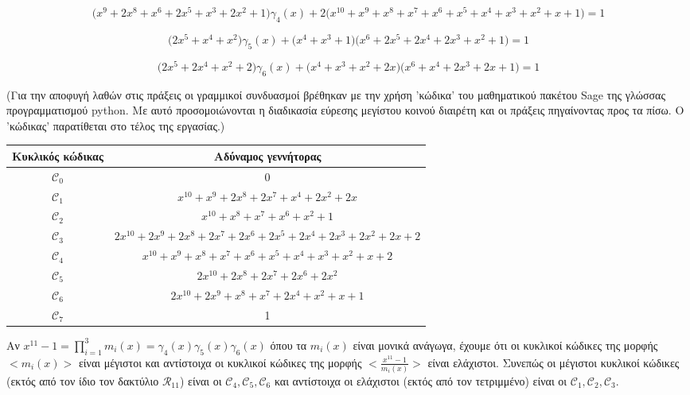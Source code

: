 \documentclass[oneside,a4paper]{article}
\newcommand {\tl}{\textlatin}
\newcommand{\C}{\mathcal{C}}
\newcommand{\R}{\mathcal{R}_{11}}
\begin{document}
\begin{enumerate}
	$$\bigg(x^{9} + 2 x^{8} + x^{6} + 2 x^{5} + x^{3} + 2 x^{2} + 1\bigg) \gamma_4 (x) + 2 \bigg(x^{10} + x^{9} + x^{8} + x^{7} + x^{6} + x^{5} + x^{4} + x^{3} + x^{2} + x + 1\bigg) = 1$$ 

	$$\bigg(2 x^{5} + x^{4} + x^{2}\bigg) \gamma_5 (x) + \bigg(x^{4} + x^{3} + 1\bigg)\bigg(x^{6} + 2 x^{5} + 2 x^{4} + 2 x^{3} + x^{2} + 1\bigg) = 1$$ 

	$$\bigg(2 x^{5} + 2 x^{4} + x^{2} + 2\bigg) \gamma_6 (x) + \bigg(x^{4} + x^{3} + x^{2} + 2 x\bigg)\bigg(x^{6} + x^{4} + 2 x^{3} + 2 x + 1\bigg) = 1$$

	(Για την αποφυγή λαθών στις πράξεις οι γραμμικοί συνδυασμοί βρέθηκαν με την χρήση 'κώδικα' του μαθηματικού πακέτου \tl{Sage} της γλώσσας προγραμματισμού \tl{python}. Με αυτό προσομοιώνονται η διαδικασία εύρεσης μεγίστου κοινού διαιρέτη και οι πράξεις πηγαίνοντας προς τα πίσω. Ο 'κώδικας' παρατίθεται στο τέλος της εργασίας.)  

	\begin{center}
\begin{tabular}{ |c|c| }
\hline
Κυκλικός κώδικας & Αδύναμος γεννήτορας \\
\hline
 $\C_0$   & 0  \\
\hline 
 $\C_1$ & $x^{10} + x^9 + 2x^8 + 2x^7 + x^4 + 2x^2 + 2x$ \\
\hline 
$\C_2$  &  $x^{10} + x^8 + x^7 + x^6 + x^2 + 1$\\     
\hline 
 $\C_3$  &   $2x^{10} + 2x^9 + 2x^8 + 2x^7 + 2x^6 + 2x^5 + 2x^4 + 2x^3 + 2x^2 + 2x + 2$ \\
\hline 
 $\C_4$  &  $ x^{10} + x^9 + x^8 + x^7 + x^6 + x^5 + x^4 + x^3 + x^2 + x + 2$ \\
\hline 
 $\C_5$  &  $2x^{10} + 2x^8 + 2x^7 + 2x^6 + 2x^2$ \\
\hline 
 $\C_6$  &   $2x^{10} + 2x^9 + x^8 + x^7 + 2x^4 + x^2 + x + 1$ \\
\hline 
 $\C_7$  &  1  \\
\hline
\end{tabular}
\end{center}


	Αν $x^{11} - 1 = \prod\limits_{i=1}^3 m_i (x) = \gamma_4 (x) \gamma_5 (x) \gamma_6 (x) $ όπου τα $m_i (x)$ είναι μονικά ανάγωγα, έχουμε ότι οι κυκλικοί κώδικες της μορφής $< m_i (x) >$ είναι μέγιστοι και αντίστοιχα οι κυκλικοί κώδικες της μορφής $< \frac{x^{11} - 1}{m_i (x)} >$ είναι ελάχιστοι. Συνεπώς οι μέγιστοι κυκλικοί κώδικες (εκτός από τον ίδιο τον δακτύλιο $\R$) είναι οι $\C_4 , \C_5, \C_6$ και αντίστοιχα οι ελάχιστοι (εκτός από τον τετριμμένο) είναι οι $\C_1 , \C_2 , \C_3$.
	$ $\newline


\end{enumerate}
\end{document}

